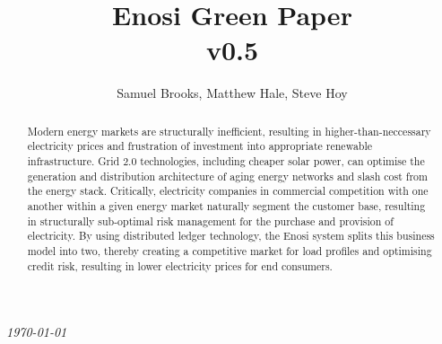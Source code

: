 \documentclass{article}
\theoremstyle{definition}
\theoremstyle{plain} %
\begin{document}

\title{Enosi Green Paper\\ v0.5}
\author{Samuel Brooks, Matthew Hale, Steve Hoy}
\date{}

\maketitle

\hfill

\begin{abstract}
\noindent Modern energy markets are structurally inefficient, resulting in higher-than-neccessary electricity prices and frustration of investment into appropriate renewable infrastructure.
Grid 2.0 technologies, including cheaper solar power, can optimise the generation and distribution architecture of aging energy networks and slash cost from the energy stack.
Critically, electricity companies in commercial competition with one another within a given energy market naturally segment the customer base, resulting in structurally sub-optimal risk management for the purchase and provision of electricity. By using distributed ledger technology, the Enosi system splits this business model into two, thereby creating a competitive market for load profiles and optimising credit risk, resulting in lower electricity prices for end consumers.
\end{abstract}
\vspace{20mm}
\begin{center}
  \small{\textit{\today}}
\end{center}


\pagebreak

\tableofcontents


\pagebreak

%
%
%



%
%

%
%
\end{document}
